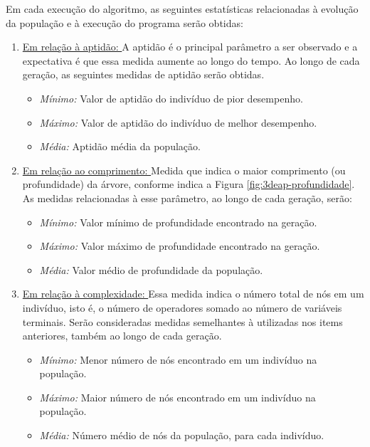 Em cada execução do algoritmo, as seguintes estatísticas relacionadas à evolução da população e à execução do programa serão obtidas:

\begin{enumerate}[label=\alph*)]
	\item \underline{Em relação à aptidão: } A aptidão é o principal parâmetro a ser observado e a expectativa é que essa medida aumente ao longo do tempo. Ao longo de cada geração, as seguintes medidas de aptidão serão obtidas.
		\begin{itemize}[label=\raisebox{0.25ex}{\tiny$\bullet$}]
			\item \textit{Mínimo: } Valor de aptidão do indivíduo de pior desempenho.
			\item \textit{Máximo: } Valor de aptidão do indivíduo de melhor desempenho.
			\item \textit{Média: } Aptidão média da população.
		\end{itemize}
	\item \underline{Em relação ao comprimento: } Medida que indica o maior comprimento (ou profundidade) da árvore, conforme indica a Figura \ref{fig:3deap-profundidade}. As medidas relacionadas à esse parâmetro, ao longo de cada geração, serão:
		\begin{itemize}[label=\raisebox{0.25ex}{\tiny$\bullet$}]
			\item \textit{Mínimo: } Valor mínimo de profundidade encontrado na geração.
			\item \textit{Máximo: } Valor máximo de profundidade encontrado na geração.
			\item \textit{Média: } Valor médio de profundidade da população.
		\end{itemize}
	\item \underline{Em relação à complexidade: } Essa medida indica o número total de nós em um indivíduo, isto é, o número de operadores somado ao número de variáveis terminais. Serão consideradas medidas semelhantes à utilizadas nos items anteriores, também ao longo de cada geração.
		\begin{itemize}[label=\raisebox{0.25ex}{\tiny$\bullet$}]
			\item \textit{Mínimo: } Menor número de nós encontrado em um indivíduo na população.
			\item \textit{Máximo: } Maior número de nós encontrado em um indivíduo na população.
			\item \textit{Média: } Número médio de nós da população, para cada indivíduo.
		\end{itemize}
\end{enumerate}


